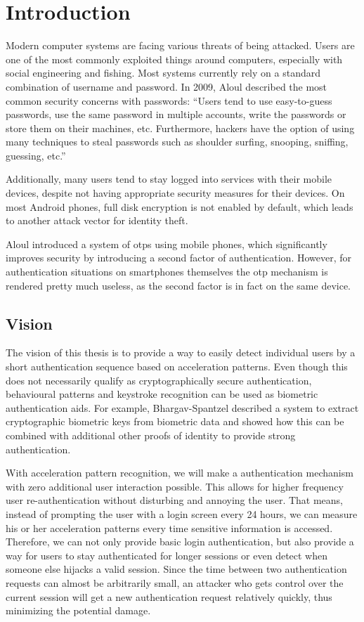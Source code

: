 \chapter{Introduction}\label{chapter:introduction}
Modern computer systems are facing various threats of being attacked. Users are one of the most commonly exploited things around computers, especially with social engineering and fishing. Most systems currently rely on a standard combination of username and password. In 2009, Aloul \etal described the most common security concerns with passwords\cite{aloul2009two}:
``Users tend to use easy-to-guess passwords, use the same password in multiple accounts, write the passwords or store them on their machines, etc. Furthermore, hackers have the option of using many techniques to steal passwords such as shoulder surfing, snooping, sniffing, guessing, etc.''

Additionally, many users tend to stay logged into services with their mobile devices, despite not having appropriate security measures for their devices. On most Android phones, full disk encryption is not enabled by default, which leads to another attack vector for identity theft.

Aloul \etal introduced a system of \glspl{otp} using mobile phones, which significantly improves security by introducing a second factor of authentication. However, for authentication situations on smartphones themselves the \gls{otp} mechanism is rendered pretty much useless, as the second factor is in fact on the same device.

\section{Vision}
The vision of this thesis is to provide a way to easily detect individual users by a short authentication sequence based on acceleration patterns. Even though this does not necessarily qualify as cryptographically secure authentication, behavioural patterns and keystroke recognition can be used as biometric authentication aids. For example, Bhargav-Spantzel \etal \cite{bhargav2006privacy} described a system to extract cryptographic biometric keys from biometric data and showed how this can be combined with additional other proofs of identity to provide strong authentication.

With acceleration pattern recognition, we will make a authentication mechanism with zero additional user interaction possible. This allows for higher frequency user re-authentication without disturbing and annoying the user. That means, instead of prompting the user with a login screen every 24 hours, we can measure his or her acceleration patterns every time sensitive information is accessed. Therefore, we can not only provide basic login authentication, but also provide a way for users to stay authenticated for longer sessions or even detect when someone else hijacks a valid session. Since the time between two authentication requests can almost be arbitrarily small, an attacker who gets control over the current session will get a new authentication request relatively quickly, thus minimizing the potential damage.
